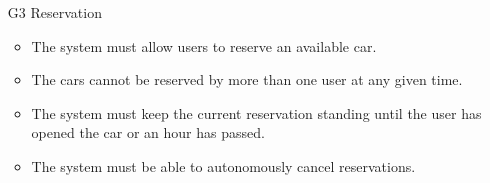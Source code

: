 \begin{itemize}
				\item [G3] Reservation %
					\begin{itemize}
						\item The system must allow users to reserve an available car.
						\item The cars cannot be reserved by more than one user at any given time.
						\item The system must keep the current reservation standing until the user has opened the car or an hour has passed. %
						\item The system must be able to autonomously cancel reservations.
					\end{itemize}


\end{itemize}
